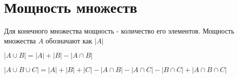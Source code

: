 \section{Мощность множеств}

\begin{definition}
    Для конечного множества мощность - количество его элементов. Мощность множества $A$ обозначают как $|A|$ 
\end{definition}

\begin{theorem}
    $|A \cup B| = |A| + |B| - |A \cap B|$
\end{theorem}

\begin{theorem}
    $|A \cup B \cup C| = |A| + |B| + |C| - |A \cap B| - |A \cap C| - |B \cap C| + |A \cap B \cap C|$
\end{theorem}